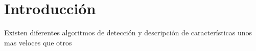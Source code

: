 \chapter{Introducción}

Existen diferentes algoritmos de detección y descripción de características unos mas veloces que otros  
